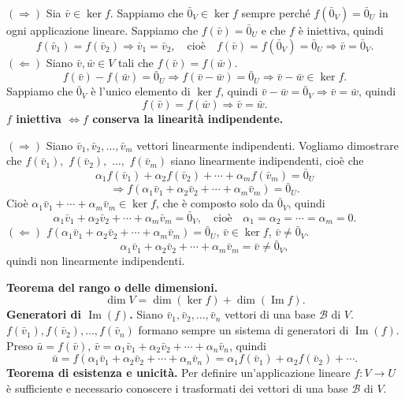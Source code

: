 \documentclass[11pt,a4paper]{article}
\newcommand{\pagina}[1]{\clearpage}
\begin{document}
$(\Rightarrow)$ Sia $\bar v\in\ker f$. Sappiamo che $\bar0_V\in\ker f$ sempre perché $f(\bar0_V)=\bar0_U$ in ogni applicazione lineare. Sappiamo che $f(\bar v)=\bar0_U$ e che $f$ è iniettiva, quindi
\[f(\bar v_1)=f(\bar v_2)\Longrightarrow\bar v_1=\bar v_2,\quad\text{cioè}\quad f(\bar v)=f(\bar0_V)=\bar0_U\Longrightarrow\bar v=\bar0_V.\]
$(\Leftarrow)$ Siano $\bar v,\bar w\in V$ tali che $f(\bar v)=f(\bar w)$.
\[f(\bar v)-f(\bar w)=\bar0_U\Longrightarrow f(\bar v-\bar w)=\bar0_U\Longrightarrow\bar v-\bar w\in\ker f.\]
Sappiamo che $\bar0_V$ è l'unico elemento di $\ker f$, quindi $\bar v-\bar w=\bar0_V\Longrightarrow\bar v=\bar w$, quindi
\[f(\bar v)=f(\bar w)\Longrightarrow\bar v=\bar w.\]
\textbf{$f$ iniettiva $\Longleftrightarrow f$ conserva la linearità indipendente.}

$(\Rightarrow)$ Siano $\bar v_1,\bar v_2,\ldots,\bar v_m$ vettori linearmente indipendenti. Vogliamo dimostrare che $f(\bar v_1),$ $f(\bar v_2),$ $\ldots,$ $f(\bar v_m)$ siano linearmente indipendenti, cioè che
\[\alpha_1f(\bar v_1)+\alpha_2f(\bar v_2)+\cdots+\alpha_mf(\bar v_m)=\bar0_U\]
\[\Longrightarrow f(\alpha_1\bar v_1+\alpha_2\bar v_2+\cdots+\alpha_m\bar v_m)=\bar0_U.\]
Cioè $\alpha_1\bar v_1+\cdots+\alpha_m\bar v_m\in\ker f$, che è composto solo da $\bar0_V$, quindi
\[\alpha_1\bar v_1+\alpha_2\bar v_2+\cdots+\alpha_m\bar v_m=\bar0_V,\quad\text{cioè}\quad\alpha_1=\alpha_2=\cdots=\alpha_m=0.\]
$(\Leftarrow)$ $f(\alpha_1\bar v_1+\alpha_2\bar v_2+\cdots+\alpha_m\bar v_m)=\bar0_U$, $\bar v\in\ker f$, $\bar v\ne\bar0_V$.
\[\alpha_1\bar v_1+\alpha_2\bar v_2+\cdots+\alpha_m\bar v_m=\bar v\ne\bar0_V,\]
quindi non linearmente indipendenti.

\pagina{42}
\textbf{Teorema del rango o delle dimensioni.}
\[\dim V=\dim(\ker f)+\dim(\operatorname{Im}f).\]
\textbf{Generatori di $\operatorname{Im}(f)$.} Siano $\bar v_1,\bar v_2,\ldots,\bar v_n$ vettori di una base $\mathcal B$ di $V$. $f(\bar v_1),f(\bar v_2),\ldots,f(\bar v_n)$ formano sempre un sistema di generatori di $\operatorname{Im}(f)$.
Preso $\bar u=f(\bar v)$, $\bar v=\alpha_1\bar v_1+\alpha_2\bar v_2+\cdots+\alpha_n\bar v_n$, quindi
\[\bar u=f(\alpha_1\bar v_1+\alpha_2\bar v_2+\cdots+\alpha_n\bar v_n)=\alpha_1f(\bar v_1)+\alpha_2f(\bar v_2)+\cdots.\]
\textbf{Teorema di esistenza e unicità.} Per definire un'applicazione lineare $f:V\to U$ è sufficiente e necessario conoscere i trasformati dei vettori di una base $\mathcal B$ di $V$.
\end{document}
